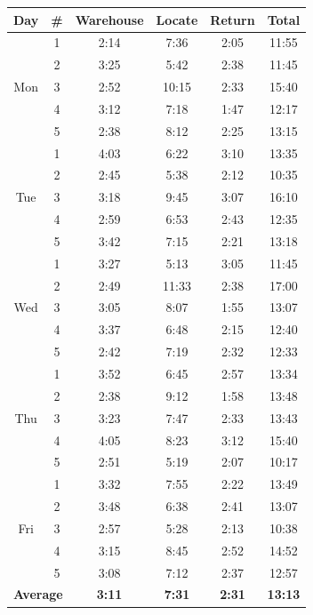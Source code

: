 \begin{table}[htbp]
\centering
\small
\begin{tabular}{|c|c|c|c|c|c|}
\hline
\textbf{Day} & \textbf{\#} & \textbf{Warehouse} & \textbf{Locate} & \textbf{Return} & \textbf{Total} \\
\hline
\multirow{5}{*}{Mon} & 1 & 2:14 & 7:36 & 2:05 & 11:55 \\
& 2 & 3:25 & 5:42 & 2:38 & 11:45 \\
& 3 & 2:52 & 10:15 & 2:33 & 15:40 \\
& 4 & 3:12 & 7:18 & 1:47 & 12:17 \\
& 5 & 2:38 & 8:12 & 2:25 & 13:15 \\
\hline
\multirow{5}{*}{Tue} & 1 & 4:03 & 6:22 & 3:10 & 13:35 \\
& 2 & 2:45 & 5:38 & 2:12 & 10:35 \\
& 3 & 3:18 & 9:45 & 3:07 & 16:10 \\
& 4 & 2:59 & 6:53 & 2:43 & 12:35 \\
& 5 & 3:42 & 7:15 & 2:21 & 13:18 \\
\hline
\multirow{5}{*}{Wed} & 1 & 3:27 & 5:13 & 3:05 & 11:45 \\
& 2 & 2:49 & 11:33 & 2:38 & 17:00 \\
& 3 & 3:05 & 8:07 & 1:55 & 13:07 \\
& 4 & 3:37 & 6:48 & 2:15 & 12:40 \\
& 5 & 2:42 & 7:19 & 2:32 & 12:33 \\
\hline
\multirow{5}{*}{Thu} & 1 & 3:52 & 6:45 & 2:57 & 13:34 \\
& 2 & 2:38 & 9:12 & 1:58 & 13:48 \\
& 3 & 3:23 & 7:47 & 2:33 & 13:43 \\
& 4 & 4:05 & 8:23 & 3:12 & 15:40 \\
& 5 & 2:51 & 5:19 & 2:07 & 10:17 \\
\hline
\multirow{5}{*}{Fri} & 1 & 3:32 & 7:55 & 2:22 & 13:49 \\
& 2 & 3:48 & 6:38 & 2:41 & 13:07 \\
& 3 & 2:57 & 5:28 & 2:13 & 10:38 \\
& 4 & 3:15 & 8:45 & 2:52 & 14:52 \\
& 5 & 3:08 & 7:12 & 2:37 & 12:57 \\
\hline
\multicolumn{2}{|c|}{\textbf{Average}} & \textbf{3:11} & \textbf{7:31} & \textbf{2:31} & \textbf{13:13} \\
\hline
\end{tabular}

\medskip
\end{table}

